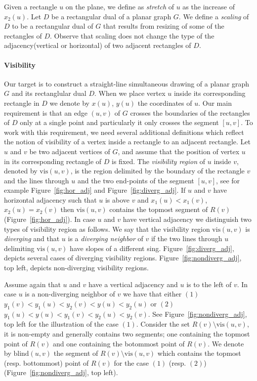 \documentclass{llncs}
\newcommand{\vis}{\textrm{vis}}
\newcommand{\blind}{\textrm{blind}}
\begin{document}
Given a rectangle $u$ on the plane, we define as \emph{stretch} of $u$ as the increase of $x_2(u)$.  Let $D$ be a rectangular dual of a planar graph $G$. We define a \emph{scaling} of $D$ to be a rectangular dual of $G$ that results from resizing of some of the rectangles of $D$. Observe that scaling does not change the type of the adjacency(vertical or horizontal) of two adjacent rectangles of $D$. 

\paragraph{\bf Visibility} Our target is to construct a straight-line simultaneous drawing of a planar graph $G$ and its rectanglular dual $D$.  When we place vertex $u$ inside its corresponding rectangle in $D$ we denote by $x(u)$, $y(u)$ the coordinates of $u$.  Our main requirement is that an edge $(u,v)$ of $G$ crosses the boundaries of the rectangles of $D$ only at a single point and particularly it only crosses the segment $[u,v]$.   To work with this requirement, we need several additional definitions which reflect the notion of visibility of a vertex inside a rectangle to an adjacent rectangle.  Let $u$ and $v$ be two adjacent vertices of $G$, and assume that the position of vertex $u$ in its corresponding rectangle of $D$ is fixed. The \emph{visibility region} of $u$ inside $v$, denoted by $\vis(u,v)$, is the region delimited by the boundary of the rectangle $v$ and the lines through $u$ and the two end-points of the segment $[u,v]$, see for example Figure~\ref{fig:hor_adj} and Figure~\ref{fig:diverg_adj}.  If $u$ and $v$ have horizontal adjacency such that $u$ is above $v$ and $x_1(u)<x_1(v)$, $x_2(u)=x_2(v)$ then $\vis(u,v)$ contains the topmost segment of $R(v)$ (Figure~\ref{fig:hor_adj}). In case $u$ and $v$ have vertical adjacency we distinguish two types of visibility region as follows. We say that the visibility region $\vis(u,v)$ is \emph{diverging} and that $u$ is a \emph{diverging neighbor} of $v$  if the two lines through $u$ delimiting $\vis(u,v)$ have slopes of a different sing. Figure~\ref{fig:diverg_adj}, depicts several cases of diverging visibility regions. Figure~\ref{fig:nondiverg_adj}, top left, depicts non-diverging visibility regions.   

Assume again that $u$ and  $v$ have a vertical adjacency and $u$ is to the left of $v$. In case $u$ is a non-diverging neighbor of $v$ we have that either $(1)$ $y_1(v)<y_1(u)<y_2(v)<y(u)<y_2(u)$ or $(2)$ $y_1(u)<y(u)<y_1(v)<y_2(u)<y_2(v)$. See Figure~\ref{fig:nondiverg_adj}, top left for the illustration of the case $(1)$. Consider the set  $R(v)\setminus \vis(u,v)$, it is  non-empty and generally contains two segments; one containing the topmost point of $R(v)$ and one containing the botommost point of $R(v)$. We denote by $\blind(u,v)$  the segment of $R(v)\setminus \vis(u,v)$ which contains the topmost (resp. bottommost) point of $R(v)$ for the case $(1)$ (resp. $(2)$) (Figure~\ref{fig:nondiverg_adj}, top left). 
\end{document}
